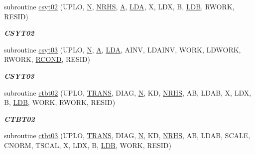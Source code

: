 \begin{DoxyCompactItemize}
subroutine \hyperlink{group__complex__lin_gaf4cd31b18e43b28fad005cbfdb370e56}{csyt02} (U\+P\+L\+O, \hyperlink{polmisc_8c_a0240ac851181b84ac374872dc5434ee4}{N}, \hyperlink{example__user_8c_aa0138da002ce2a90360df2f521eb3198}{N\+R\+H\+S}, \hyperlink{classA}{A}, \hyperlink{example__user_8c_ae946da542ce0db94dced19b2ecefd1aa}{L\+D\+A}, X, L\+D\+X, B, \hyperlink{example__user_8c_a50e90a7104df172b5a89a06c47fcca04}{L\+D\+B}, R\+W\+O\+R\+K, R\+E\+S\+I\+D)
\begin{DoxyCompactList}\small\item\em {\bfseries C\+S\+Y\+T02} \end{DoxyCompactList}\item 
subroutine \hyperlink{group__complex__lin_gaf85a8c0c00720ced316e293009494a56}{csyt03} (U\+P\+L\+O, \hyperlink{polmisc_8c_a0240ac851181b84ac374872dc5434ee4}{N}, \hyperlink{classA}{A}, \hyperlink{example__user_8c_ae946da542ce0db94dced19b2ecefd1aa}{L\+D\+A}, A\+I\+N\+V, L\+D\+A\+I\+N\+V, W\+O\+R\+K, L\+D\+W\+O\+R\+K, R\+W\+O\+R\+K, \hyperlink{superlu__enum__consts_8h_af00a42ecad444bbda75cde1b64bd7e72a9b5c151728d8512307565994c89919d5}{R\+C\+O\+N\+D}, R\+E\+S\+I\+D)
\begin{DoxyCompactList}\small\item\em {\bfseries C\+S\+Y\+T03} \end{DoxyCompactList}\item 
subroutine \hyperlink{group__complex__lin_ga7f7e68446354a1acd6abbc21221236b2}{ctbt02} (U\+P\+L\+O, \hyperlink{superlu__enum__consts_8h_a0c4e17b2d5cea33f9991ccc6a6678d62a1f61e3015bfe0f0c2c3fda4c5a0cdf58}{T\+R\+A\+N\+S}, D\+I\+A\+G, \hyperlink{polmisc_8c_a0240ac851181b84ac374872dc5434ee4}{N}, K\+D, \hyperlink{example__user_8c_aa0138da002ce2a90360df2f521eb3198}{N\+R\+H\+S}, A\+B, L\+D\+A\+B, X, L\+D\+X, B, \hyperlink{example__user_8c_a50e90a7104df172b5a89a06c47fcca04}{L\+D\+B}, W\+O\+R\+K, R\+W\+O\+R\+K, R\+E\+S\+I\+D)
\begin{DoxyCompactList}\small\item\em {\bfseries C\+T\+B\+T02} \end{DoxyCompactList}\item 
subroutine \hyperlink{group__complex__lin_ga021f7c2619a32f8a4b40c795c76e0b02}{ctbt03} (U\+P\+L\+O, \hyperlink{superlu__enum__consts_8h_a0c4e17b2d5cea33f9991ccc6a6678d62a1f61e3015bfe0f0c2c3fda4c5a0cdf58}{T\+R\+A\+N\+S}, D\+I\+A\+G, \hyperlink{polmisc_8c_a0240ac851181b84ac374872dc5434ee4}{N}, K\+D, \hyperlink{example__user_8c_aa0138da002ce2a90360df2f521eb3198}{N\+R\+H\+S}, A\+B, L\+D\+A\+B, S\+C\+A\+L\+E, C\+N\+O\+R\+M, T\+S\+C\+A\+L, X, L\+D\+X, B, \hyperlink{example__user_8c_a50e90a7104df172b5a89a06c47fcca04}{L\+D\+B}, W\+O\+R\+K, R\+E\+S\+I\+D)

\end{DoxyCompactItemize}
